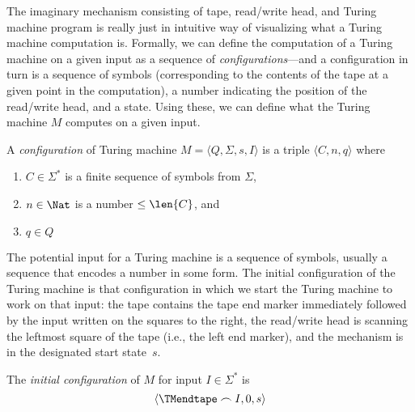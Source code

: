 \documentclass[../../include/open-logic-section]{subfiles}
\begin{document}

\begin{explain}
The imaginary mechanism consisting of tape, read/write head, and
Turing machine program is really just in intuitive way of visualizing
what a Turing machine computation is.  Formally, we can define the
computation of a Turing machine on a given input as a sequence of
\emph{configurations}---and a configuration in turn is a sequence of
symbols (corresponding to the contents of the tape at a given point in
the computation), a number indicating the position of the read/write
head, and a state.  Using these, we can define what the Turing machine
$M$ computes on a given input.
\end{explain}

\begin{defn}
A \emph{configuration} of Turing machine $M = \langle Q, \Sigma, s,
I\rangle$ is a triple $\langle C, n, q\rangle$ where
\begin{enumerate}
\item $C \in \Sigma^*$ is a finite sequence of symbols from $\Sigma$,
\item $n \in \Nat$ is a number $\le \len{C}$, and
\item $q \in Q$
\end{enumerate}
\end{defn}

\begin{explain}
The potential input for a Turing machine is a sequence of symbols,
usually a sequence that encodes a number in some form.  The initial
configuration of the Turing machine is that configuration in which we
start the Turing machine to work on that input: the tape contains the
tape end marker immediately followed by the input written on the
squares to the right, the read/write head is scanning the leftmost
square of the tape (i.e., the left end marker), and the mechanism is
in the designated start state~$s$.
\end{explain}

\begin{defn}
The \emph{initial configuration} of $M$ for input $I \in \Sigma^*$ is
\[
\langle \TMendtape \frown I, 0, s\rangle
\]
\end{defn}
\end{document}
